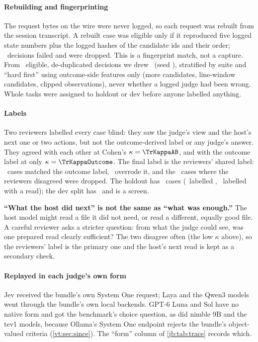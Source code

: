\paragraph{Rebuilding and fingerprinting} The request bytes on the wire were never logged, so each request
was rebuilt from the session transcript. A rebuilt case was eligible only if it reproduced five logged
state numbers plus the logged hashes of the candidate ids and their order; \TrRebuildFail\ decisions failed
and were dropped. This is a fingerprint match, not a capture. From \TrMined\ eligible, de-duplicated
decisions we drew \TrDrawn\ (seed \TrSeed), stratified by suite and ``hard first'' using outcome-side
features only (more candidates, line-window candidates, clipped observations), never whether a logged judge
had been wrong. Whole tasks were assigned to holdout or dev before anyone labelled anything.

\paragraph{Labels} Two reviewers labelled every case blind: they saw the judge's view and the host's next
one or two actions, but not the outcome-derived label or any judge's answer. They agreed with each other
at Cohen's $\kappa = \TrKappaAB$, and with the outcome label at only $\kappa = \TrKappaOutcome$. The final
label is the reviewers' shared label: \TrAgreed\ cases matched the outcome label, \TrOverridden\ overrode
it, and the \TrDropped\ cases where the reviewers disagreed were dropped. The holdout has \TrN\ cases
(\TrReasonLabels\ labelled , \TrReadCases\ labelled with a read); the dev split has \TrDevN\
and is a screen.

\begin{keyidea}
\textbf{``What the host did next'' is not the same as ``what was enough.''} The host model might read a file
it did not need, or read a different, equally good file. A careful reviewer asks a stricter question: from
what the judge could see, was one prepared read clearly sufficient? The two disagree often (the low $\kappa$
above), so the reviewers' label is the primary one and the host's next read is kept as a secondary check.
\end{keyidea}

\paragraph{Replayed in each judge's own form} Jev received the bundle's own System One request; Laya and
the Qwen3 models went through the bundle's own local backends. GPT-6 Luna and Sol have no native form and
got the benchmark's choice question, as did nimble 9B and the tev1 models, because Ollama's System One
endpoint rejects the bundle's object-valued criteria (\cref{vt:sec:since}). The ``form'' column of
\cref{jb:tab:trace} records which.

